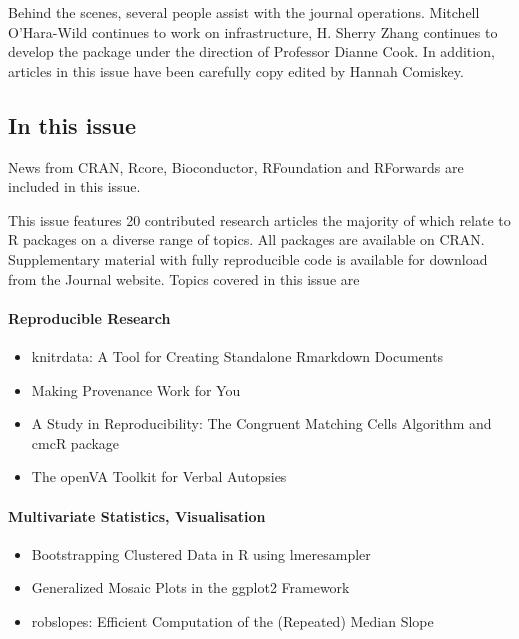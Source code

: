 Behind the scenes, several people assist with the journal operations. Mitchell O'Hara-Wild continues to work on infrastructure, H. Sherry Zhang continues to develop the  package under the direction of Professor Dianne Cook. In addition, articles in this issue have been carefully copy edited by Hannah Comiskey.

\hypertarget{in-this-issue}{%
\subsection{In this issue}\label{in-this-issue}}

News from CRAN, Rcore, Bioconductor, RFoundation and RForwards are included in this issue.

\noindent This issue features 20 contributed research articles the majority of which relate to R packages
on a diverse range of topics. All packages are available on CRAN. Supplementary material with fully reproducible code is available for download from the Journal website. Topics covered in this issue are

\hypertarget{reproducible-research}{%
\paragraph{Reproducible Research}\label{reproducible-research}}

\begin{itemize}
\tightlist
\item
  knitrdata: A Tool for Creating Standalone Rmarkdown Documents
\item
  Making Provenance Work for You
\item
  A Study in Reproducibility: The Congruent Matching Cells Algorithm and cmcR package
\item
  The openVA Toolkit for Verbal Autopsies
\end{itemize}

\hypertarget{multivariate-statistics-visualisation}{%
\paragraph{Multivariate Statistics, Visualisation}\label{multivariate-statistics-visualisation}}

\begin{itemize}
\tightlist
\item
  Bootstrapping Clustered Data in R using lmeresampler
\item
  Generalized Mosaic Plots in the ggplot2 Framework
\item
  robslopes: Efficient Computation of the (Repeated) Median Slope
\end{itemize}


